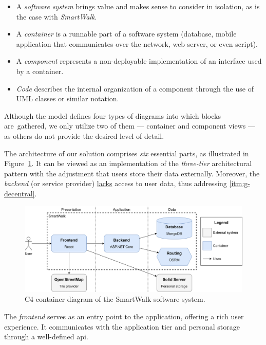 \begin{itemize}
\item A \emph{software system} brings value and makes sense to consider in isolation, as is the case with \emph{SmartWalk}.
\item A \emph{container} is a runnable part of a software system (database, mobile application that communicates over the network, web server, or even script).
\item A \emph{component} represents a non-deployable implementation of an interface used by a container.
\item \emph{Code} describes the internal organization of a component through the use of UML classes or similar notation.
\end{itemize}

Although the model defines four types of diagrams into which blocks are~gathered, we only utilize two of them --- container and component views --- as others do not provide the desired level of detail.

The architecture of our solution comprises \emph{six} essential parts, as illustrated in Figure~\ref{fig:c4-container-diagram}. It can be viewed as an implementation of the \emph{three-tier} architectural pattern with the adjustment that users store their data externally. Moreover, the \emph{backend} (or service provider) \underline{lacks} access to user data, thus addressing \ref{itm:g-decentral}.

\begin{figure}[!h]
\centering
\includegraphics[width=\linewidth]{img/design/c4-container-diagram.png}
\caption{C4 container diagram of the SmartWalk software system.}
\label{fig:c4-container-diagram}
\end{figure}

The \emph{frontend} serves as an entry point to the application, offering a rich user experience. It communicates with the application tier and personal storage through a well-defined \ac{api}.

